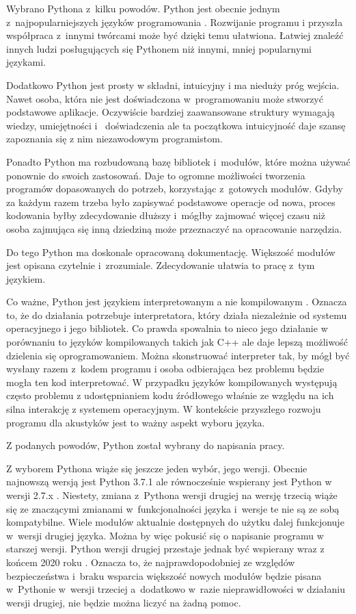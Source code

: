 \documentclass[eng,printmode]{mgr}
\begin{document}
Wybrano Pythona z~kilku powodów. Python jest obecnie jednym z~najpopularniejszych języków programowania  \cite{Python_popular}. Rozwijanie programu i przyszła współpraca z~innymi twórcami może być dzięki temu ułatwiona. Łatwiej znaleźć innych ludzi posługujących się Pythonem niż innymi, mniej popularnymi językami. 

Dodatkowo Python jest prosty w składni, intuicyjny i ma nieduży próg wejścia. Nawet osoba, która nie jest doświadczona w~programowaniu może stworzyć podstawowe aplikacje. Oczywiście bardziej zaawansowane struktury wymagają wiedzy, umiejętności i~ doświadczenia ale ta początkowa intuicyjność daje szansę zapoznania się z nim niezawodowym programistom.

Ponadto Python ma rozbudowaną bazę bibliotek i~modułów, które można używać ponownie do swoich zastosowań\cite{Pypie}. Daje to ogromne możliwości tworzenia programów dopasowanych do potrzeb, korzystając z~gotowych modułów. Gdyby za każdym razem trzeba było zapisywać podstawowe operacje od nowa, proces kodowania byłby zdecydowanie dłuższy i~mógłby zajmować więcej czasu niż osoba zajmująca się inną dziedziną może przeznaczyć na opracowanie narzędzia. 

Do tego Python ma doskonale opracowaną dokumentację. Większość modułów jest opisana czytelnie i~zrozumiale. Zdecydowanie ułatwia to pracę z~tym językiem. 

Co ważne, Python jest językiem interpretowanym a nie kompilowanym \newline
\cite{Przewodnik_po_pythonie}. Oznacza to, że do działania potrzebuje interpretatora, który działa niezależnie od systemu operacyjnego i jego bibliotek. Co prawda spowalnia to nieco jego działanie w porównaniu to języków kompilowanych takich jak C++ ale daje lepszą możliwość dzielenia się oprogramowaniem. Można skonstruować interpreter tak, by mógł być wysłany razem z~kodem programu i osoba odbierająca bez problemu będzie mogła ten kod interpretować. W przypadku języków kompilowanych występują często problemu  z udostępnianiem kodu źródłowego właśnie ze względu na ich silna interakcję z systemem operacyjnym. W kontekście przyszłego rozwoju programu dla akustyków jest to ważny aspekt wyboru języka.

Z podanych powodów, Python został wybrany do napisania pracy.

Z wyborem Pythona wiąże się jeszcze jeden wybór, jego wersji. Obecnie najnowszą wersją jest Python 3.7.1 ale równocześnie wspierany jest Python w wersji 2.7.x \newline\cite{Python_latest_release}. Niestety, zmiana z~Pythona wersji drugiej na wersję trzecią wiąże się ze znaczącymi zmianami w~funkcjonalności języka i~wersje te nie są ze sobą kompatybilne. Wiele modułów aktualnie dostępnych do użytku dalej funkcjonuje w~wersji drugiej języka. Można by więc pokusić się o napisanie programu w starszej wersji. Python wersji drugiej przestaje jednak być wspierany wraz z końcem 2020 roku \cite{Python_end_of_life}. Oznacza to, że najprawdopodobniej ze względów bezpieczeństwa i~braku wsparcia większość nowych modułów będzie pisana w~Pythonie w~wersji trzeciej a~dodatkowo w~razie nieprawidłowości w działaniu wersji drugiej, nie będzie można liczyć na żadną pomoc.
\end{document}
